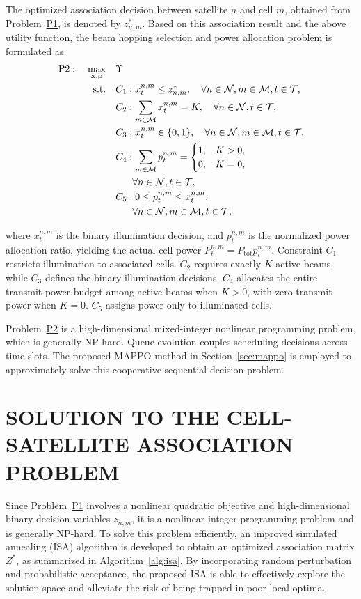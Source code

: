 \documentclass[journal]{IEEEtran}
\begin{document}
The optimized association decision between satellite $n$ and cell $m$, obtained from Problem~\hyperref[prob:p1]{P1}, is denoted by $z_{n,m}^*$. Based on this association result and the above utility function, the beam hopping selection and power allocation problem is formulated as
\begin{equation}
\label{prob:p2}
\begin{aligned}
\mathrm{P2}:\quad
\max_{\mathbf{x},\mathbf{p}}\quad
& \Upsilon \\
\mathrm{s.t.}\quad
& C_1:x_t^{n,m}\leq z_{n,m}^*,\quad \forall n\in\mathcal{N},m\in\mathcal{M},t\in\mathcal{T},\\
& C_2:\sum_{m\in\mathcal{M}}x_t^{n,m}=K,\quad \forall n\in\mathcal{N},t\in\mathcal{T},\\
& C_3:x_t^{n,m}\in\{0,1\},\quad \forall n\in\mathcal{N},m\in\mathcal{M},t\in\mathcal{T},\\
& C_4:\sum_{m\in\mathcal{M}}p_t^{n,m}=
\begin{cases}
1,&K>0,\\
0,&K=0,
\end{cases}\\
& \hphantom{C_4:}\forall n\in\mathcal{N},t\in\mathcal{T},\\
& C_5:0\leq p_t^{n,m}\leq x_t^{n,m},\\
& \hphantom{C_5:}\forall n\in\mathcal{N},m\in\mathcal{M},t\in\mathcal{T},
\end{aligned}
\end{equation}

where $x_t^{n,m}$ is the binary illumination decision, and $p_t^{n,m}$ is the normalized power allocation ratio, yielding the actual cell power $P_t^{n,m}=P_{\mathrm{tot}}p_t^{n,m}$. Constraint $C_1$ restricts illumination to associated cells. $C_2$ requires exactly $K$ active beams, while $C_3$ defines the binary illumination decisions. $C_4$ allocates the entire transmit-power budget among active beams when $K>0$, with zero transmit power when $K=0$. $C_5$ assigns power only to illuminated cells.

Problem~\hyperref[prob:p2]{P2} is a high-dimensional mixed-integer nonlinear programming problem, which is generally NP-hard. Queue evolution couples scheduling decisions across time slots. The proposed MAPPO method in Section~\ref{sec:mappo} is employed to approximately solve this cooperative sequential decision problem.

\section{SOLUTION TO THE CELL-SATELLITE ASSOCIATION PROBLEM}
\label{sec:association-solution}
Since Problem~\hyperref[prob:p1]{P1} involves a nonlinear quadratic objective and high-dimensional binary decision variables $z_{n,m}$, it is a nonlinear integer programming problem and is generally NP-hard. To solve this problem efficiently, an improved simulated annealing (ISA) algorithm is developed to obtain an optimized association matrix $Z^*$, as summarized in Algorithm~\ref{alg:isa}. By incorporating random perturbation and probabilistic acceptance, the proposed ISA is able to effectively explore the solution space and alleviate the risk of being trapped in poor local optima.
\end{document}
